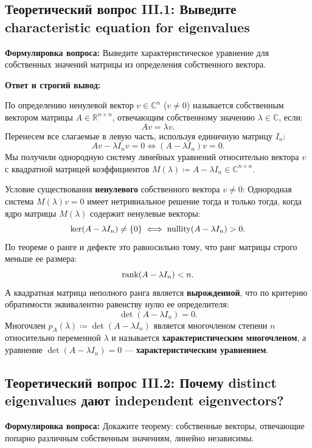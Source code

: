 
    \subsection{Теоретический вопрос III.1: Выведите characteristic equation for eigenvalues}
\textbf{Формулировка вопроса:} Выведите характеристическое уравнение для собственных значений матрицы из определения
собственного вектора.

\textbf{Ответ и строгий вывод:}

По определению ненулевой вектор $v \in \mathbb{C}^n$ ($v \ne 0$) называется собственным вектором матрицы $A \in
\mathbb{R}^{n \times n}$, отвечающим собственному значению $\lambda \in \mathbb{C}$, если: \[ A v = \lambda v.
\] Перенесем все слагаемые в левую часть, используя единичную матрицу $I_n$: \[ A v - \lambda I_n v = 0 \iff (A -
\lambda I_n) v = 0.
\] Мы получили однородную систему линейных уравнений относительно вектора $v$ с квадратной матрицей коэффициентов
$M(\lambda) \coloneqq A - \lambda I_n \in \mathbb{C}^{n \times n}$.

Условие существования \textbf{ненулевого} собственного вектора $v \ne 0$: Однородная система $M(\lambda) v = 0$ имеет
нетривиальное решение тогда и только тогда, когда ядро матрицы $M(\lambda)$ содержит ненулевые векторы: \[ \ker(A -
\lambda I_n) \ne \{0\} \iff \operatorname{nullity}(A - \lambda I_n) > 0.
\] По теореме о ранге и дефекте это равносильно тому, что ранг матрицы строго меньше ее размера: \[ \operatorname{rank}(A - \lambda
I_n) < n.
\] А квадратная матрица неполного ранга является \textbf{вырожденной}, что по критерию обратимости эквивалентно
равенству нулю ее определителя: \[ \det(A - \lambda I_n) = 0.
\] Многочлен $p_A(\lambda) \coloneqq \det(A - \lambda I_n)$ является многочленом степени $n$ относительно переменной
$\lambda$ и называется \textbf{характеристическим многочленом}, а уравнение $\det(A - \lambda I_n) = 0$ —
\textbf{характеристическим уравнением}.


    \subsection{Теоретический вопрос III.2: Почему distinct eigenvalues дают independent eigenvectors?}
\textbf{Формулировка вопроса:} Докажите теорему: собственные векторы, отвечающие попарно различным собственным
значениям, линейно независимы.

